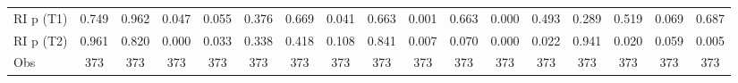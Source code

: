 {\begin{tabular}{l*{16}{c}}
RI p (T1)           &       0.749         &       0.962         &       0.047         &       0.055         &       0.376         &       0.669         &       0.041         &       0.663         &       0.001         &       0.663         &       0.000         &       0.493         &       0.289         &       0.519         &       0.069         &       0.687         \\
RI p (T2)           &       0.961         &       0.820         &       0.000         &       0.033         &       0.338         &       0.418         &       0.108         &       0.841         &       0.007         &       0.070         &       0.000         &       0.022         &       0.941         &       0.020         &       0.059         &       0.005         \\
Obs                 &         373         &         373         &         373         &         373         &         373         &         373         &         373         &         373         &         373         &         373         &         373         &         373         &         373         &         373         &         373         &         373         \\
\bottomrule
\end{tabular}
}
